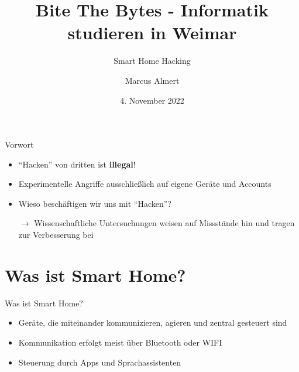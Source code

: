 \documentclass[11pt, aspectratio=169, modernfonts]{beamer}
\title[Smart Home Hacking]{Bite The Bytes - Informatik studieren in Weimar}
\subtitle{\Large{Smart Home Hacking}}
\author[M. Almert]{Marcus Almert}
\institute[Bauhaus-Universität Weimar]{Bauhaus-Universität Weimar\\[0.5cm] Fakultät Medien}
\date{4. November 2022}
\begin{document}

    \maketitle


    \begin{frame}{Vorwort}
        \begin{itemize}
            \item \enquote{Hacken} von dritten ist \textbf{illegal}!
            \item Experimentelle Angriffe ausschließlich auf eigene Geräte und Accounts
            \vspace{0.4cm}
            \item Wieso beschäftigen wir uns mit \enquote{Hacken}?
            \item[$\rightarrow$] Wissenschaftliche Untersuchungen weisen auf Missstände hin und tragen zur Verbesserung bei
        \end{itemize}
    \end{frame}


    \section{Was ist Smart Home?}\label{sec:was-ist-smart-home?}

    \begin{frame}{Was ist Smart Home?}
        \begin{itemize}
            \item Geräte, die miteinander kommunizieren, agieren und zentral gesteuert sind\\[.4cm]
            \item Kommunikation erfolgt meist über Bluetooth oder WIFI\\[.4cm]
            \item Steuerung durch Apps und Sprachassistenten\\[.4cm]
        \end{itemize}
    \end{frame}
\end{document}
